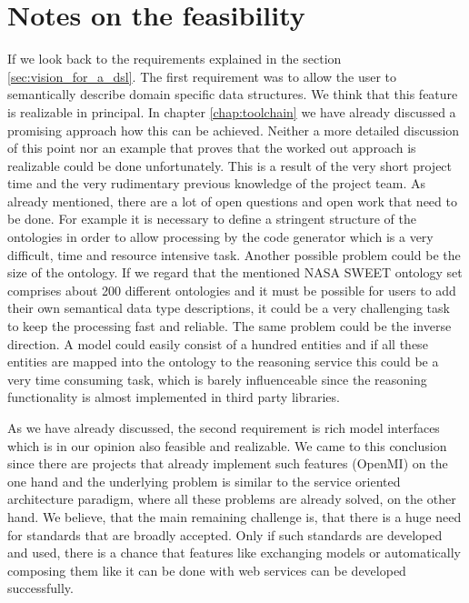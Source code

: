 \section{Notes on the feasibility}
\par
If we look back to the requirements explained in the section \ref{sec:vision_for_a_dsl}. The first requirement was to allow the user to semantically describe domain specific data structures. We think that this feature is realizable in principal. In chapter \ref{chap:toolchain} we have already discussed a promising approach how this can be achieved. Neither a more detailed discussion of this point nor an example that proves that the worked out approach is realizable could be done unfortunately. This is a result of the very short project time and the very rudimentary previous knowledge of the project team.  As already mentioned, there are a lot of open questions and open work that need to be done. For example it is necessary to define a stringent structure of the ontologies in order to allow processing by the code generator which is a very difficult, time and resource intensive task. Another possible problem could be the size of the ontology. If we regard that the mentioned NASA SWEET ontology set comprises about 200 different ontologies and it must be possible for users to add their own semantical data type descriptions, it could be a very challenging task to keep the processing fast and reliable. The same problem could be the inverse direction. A model could easily consist of a hundred entities and if all these entities are mapped into the ontology to the reasoning service this could be a very time consuming task, which is barely influenceable since the reasoning functionality is almost implemented in third party libraries.
\par
As we have already discussed, the second requirement is rich model interfaces which is in our opinion also feasible and realizable. We came to this conclusion since there are projects that already implement such features (OpenMI) on the one hand and the underlying problem is similar to the service oriented architecture paradigm, where all these problems are already solved, on the other hand. We believe, that the main remaining challenge is, that there is a huge need for standards that are broadly accepted. Only if such standards are developed and used, there is a chance that features like exchanging models or automatically composing them like it can be done with web services can be developed successfully.\\
